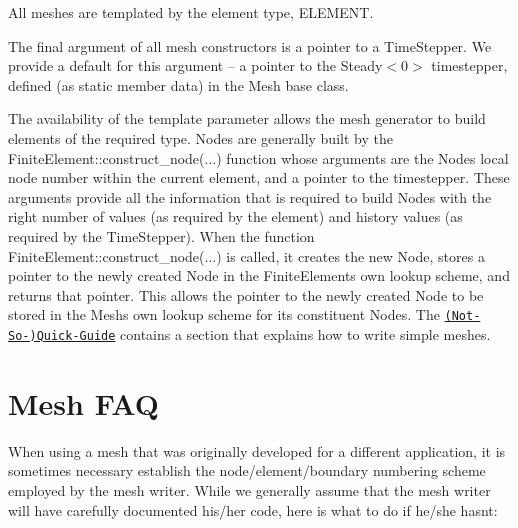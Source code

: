\begin{DoxyEnumerate}
\item All meshes are templated by the element type, {\ttfamily E\+L\+E\+M\+E\+NT}.~\newline
~\newline

\item The final argument of all mesh constructors is a pointer to a {\ttfamily Time\+Stepper}. We provide a default for this argument -- a pointer to the {\ttfamily Steady$<$0$>$} timestepper, defined (as static member data) in the {\ttfamily Mesh} base class.
\end{DoxyEnumerate}The availability of the template parameter allows the mesh generator to build elements of the required type. {\ttfamily Nodes} are generally built by the {\ttfamily Finite\+Element\+::construct\+\_\+node}(...) function whose arguments are the {\ttfamily Node\textquotesingle{}s} local node number within the current element, and a pointer to the timestepper. These arguments provide all the information that is required to build {\ttfamily Nodes} with the right number of values (as required by the element) and history values (as required by the {\ttfamily Time\+Stepper}). When the function {\ttfamily Finite\+Element\+::construct\+\_\+node}(...) is called, it creates the new {\ttfamily Node}, stores a pointer to the newly created {\ttfamily Node} in the {\ttfamily Finite\+Element\textquotesingle{}s} own lookup scheme, and returns that pointer. This allows the pointer to the newly created {\ttfamily Node} to be stored in the {\ttfamily Mesh\textquotesingle{}s} own lookup scheme for its constituent {\ttfamily Nodes}. The \href{../../../quick_guide/html/index.html#mesh}{\tt (Not-\/\+So-\/)Quick-\/\+Guide} contains a section that explains how to write simple meshes. 

 

\hypertarget{index_faq}{}\section{Mesh F\+AQ}\label{index_faq}
When using a mesh that was originally developed for a different application, it is sometimes necessary establish the node/element/boundary numbering scheme employed by the mesh writer. While we generally assume that the mesh writer will have carefully documented his/her code, here is what to do if he/she hasn\textquotesingle{}t\+: ~\newline
~\newline

